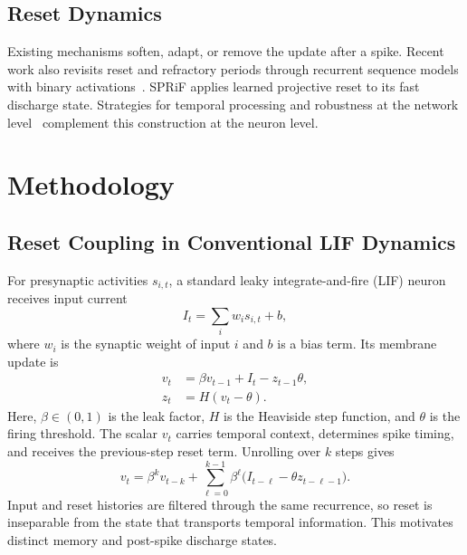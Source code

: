 \documentclass[letterpaper]{article} %
\begin{document}
\subsection{Reset Dynamics}

Existing mechanisms soften, adapt, or remove the update after a spike. Recent work also revisits reset and refractory periods through recurrent sequence models with binary activations~\cite{inflor,rplif,arlif,psn,zhang2025reset}. SPRiF applies learned projective reset to its fast discharge state. Strategies for temporal processing and robustness at the network level~\cite{mpssnn,stochastic_gating,neuromorphic_robustness} complement this construction at the neuron level.


\section{Methodology}

\subsection{Reset Coupling in Conventional LIF Dynamics}

For presynaptic activities $s_{i,t}$, a standard leaky integrate-and-fire (LIF) neuron receives input current
\begin{equation}
I_t=\sum_i w_i s_{i,t}+b,
\label{eq:lif_current}
\end{equation}
where $w_i$ is the synaptic weight of input $i$ and $b$ is a bias term. Its membrane update is
\begin{align}
v_t &= \beta v_{t-1}+I_t-z_{t-1}\theta,
\label{eq:lif_dynamics}\\
z_t &= H(v_t-\theta).
\label{eq:lif_spike}
\end{align}
Here, $\beta\in(0,1)$ is the leak factor, $H$ is the Heaviside step function, and $\theta$ is the firing threshold. The scalar $v_t$ carries temporal context, determines spike timing, and receives the previous-step reset term. Unrolling over $k$ steps gives
\begin{equation}
v_t=\beta^k v_{t-k}+\sum_{\ell=0}^{k-1}\beta^\ell\bigl(I_{t-\ell}-\theta z_{t-\ell-1}\bigr).
\label{eq:lif_unrolled}
\end{equation}
Input and reset histories are filtered through the same recurrence, so reset is inseparable from the state that transports temporal information. This motivates distinct memory and post-spike discharge states.
\end{document}
